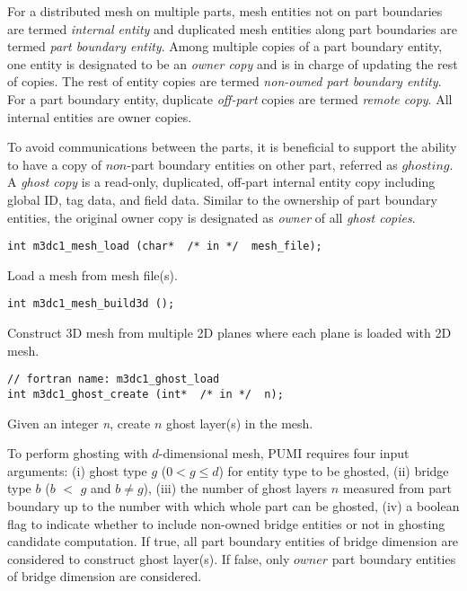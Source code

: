 For a distributed mesh on multiple parts, mesh entities not on part boundaries are termed \textit{internal entity} and duplicated mesh entities along part boundaries are termed \textit{part boundary entity}. Among multiple copies of a part boundary entity, one entity is designated to be an \textit{owner copy} and is in charge of updating the rest of copies. The rest of entity copies are termed \textit{non-owned part boundary entity}. For a part boundary entity, duplicate \textit{off-part} copies are termed \textit{remote copy}. All internal entities are owner copies.

To avoid communications between the parts, it is beneficial to support the ability to have a copy of $non$-part boundary entities on other part, referred as $ghosting$. A \textit{ghost copy} is a read-only, duplicated, off-part internal entity copy including global ID, tag data, and field data. Similar to the ownership of part boundary entities, the original owner copy is designated as \emph{owner} of all \textit{ghost copies}.

\begin{verbatim}
int m3dc1_mesh_load (char*  /* in */  mesh_file);
\end{verbatim}\vspace{-.5cm}\hspace{1cm}
Load a mesh from mesh file(s).

\begin{verbatim}
int m3dc1_mesh_build3d ();
\end{verbatim}\vspace{-.5cm}\hspace{1cm}
Construct 3D mesh from multiple 2D planes where each plane is loaded with 2D mesh. 

\begin{verbatim}
// fortran name: m3dc1_ghost_load
int m3dc1_ghost_create (int*  /* in */  n);
\end{verbatim}\vspace{-.5cm}\hspace{1cm}
Given an integer \textit{n}, create $n$ ghost layer(s) in the mesh.

To perform ghosting with $d$-dimensional mesh, PUMI requires four input arguments: (i) ghost type $g$ (0$<$$g$$\le$$d$) for entity type to be ghosted, (ii) bridge type $b$ ($b$ $<$ $g$ and $b$$\ne$$g$),  (iii) the number of ghost layers $n$ measured from part boundary up to the number with which whole part can be ghosted, (iv) a boolean flag to indicate whether to include non-owned bridge entities or not in ghosting candidate computation. If true, all part boundary entities of bridge dimension are considered to construct ghost layer(s). If false, only $owner$  part boundary entities of bridge dimension are considered. 

